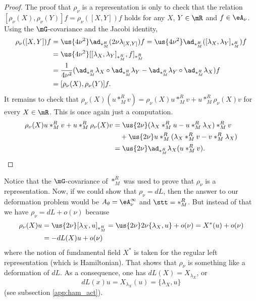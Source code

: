 \begin{proof}
The proof  that $\rho_{\nu}$ is a representation is only to check that the relation $[\rho_{\nu}(X),\rho_{\nu}(Y)]f=\rho_{\nu}([X,Y])f$ holds for any $X$, $Y\in\mR$ and $f\in\eA_{\nu}$. Using the $\mG$-covariance and the Jacobi identity,
\begin{equation}
\begin{split}
  \rho_{\nu}([X,Y])f&=\us{4\nu^2}\ad_{\ast_M^R}(2\nu\lambda_{[X,Y]})f
     		=\us{4\nu^2}\ad_{\ast_M^R}([\lambda_X,\lambda_Y]_{\ast_M^R})f\\
		&=\us{4\nu^2}[[\lambda_X,\lambda_Y]_{\ast_M^R},f]_{\ast_M^R}\\
	     	&=\frac{1}{ 4\nu^2 }(\ad_{\ast_M^R}\lambda_X\circ\ad_{\ast_M^R}\lambda_Y-\ad_{\ast_M^R}\lambda_Y\circ\ad_{\ast_M^R}\lambda_X)f\\
		&=[\rho_{\nu}(X),\rho_{\nu}(Y)]f.
\end{split}
\end{equation}
It remains to check that $\rho_{\nu}(X)(u\ast_M^R v)=\rho_{\nu}(X)u\ast_M^R v+u\ast_M^R\rho_{\nu}(X)v$ for every $X\in\mR$. This is once again just a computation.
\begin{equation}
\begin{split}
   \rho_{\nu}(X)u\ast_M^R v+u\ast_M^R\rho_{\nu}(X)v&=\us{2\nu}(\lambda_X\ast_M^R u-u\ast_M^R\lambda_X)\ast_M^R v\\
                           &\quad+\us{2\nu}u\ast_M^R(\lambda_X\ast_M^R v-v\ast_M^R\lambda_X)\\
                           &=\us{2\nu}\ad_{\ast_M^R}\lambda_X(u\ast_M^R v).
\end{split}
\end{equation} 
\end{proof}
Notice that the $\mG$-covariance of $\ast_M^R$ was used to prove that $\rho_{\nu}$ is a representation.  Now, if we could show that $\rho_{\nu}=dL$, then the answer to our deformation problem would be $A_{\theta}=\eA^{\infty}_{\nu}$ and $\stt=\ast_M^R$. But instead of that we have $\rho_{\nu}=dL+o(\nu)$ because
\begin{equation}
\begin{split}
  \rho_{\nu}(X)u&=\us{2\nu}[\lambda_X,u]_{\ast_M^R}
         =\us{2\nu} 2\nu\{\lambda_X,u\}+o(\nu)
	 =X^*(u)+o(\nu)\\
	&=-dL(X)u+o(\nu)
\end{split}
\end{equation}
where the notion of fundamental field $X^*$ is taken for the regular left representation (which is Hamiltonian). That shows that $\rho_{\nu}$ is something like a deformation of $dL$. As a consequence, one has $dL(X)=X_{\lambda_X}$, or
 \begin{equation}\label{eq:dL_et_Poisson}
 dL(x)u=X_{\lambda_X}(u)=\{\lambda_X,u\}
 \end{equation}
(see subsection \ref{app:ham_act}).
 
